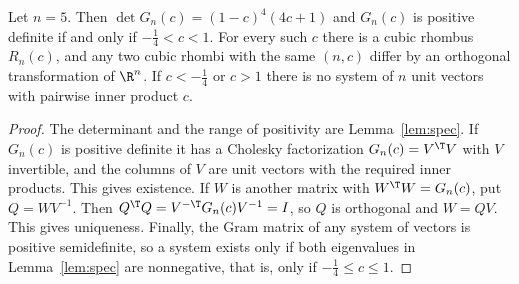 \begin{theorem}\label{thm:main}
Let $n=5$. Then $\det G_n(c)=\left(1 - c\right)^{4} \left(4 c + 1\right)$ and $G_n(c)$ is positive definite if and only if $- \frac{1}{4}<c<1$.
For every such $c$ there is a cubic rhombus $R_n(c)$, and any two cubic rhombi with the same $(n,c)$ differ by an orthogonal transformation of $\R^n$.
If $c<- \frac{1}{4}$ or $c>1$ there is no system of $n$ unit vectors with pairwise inner product $c$.
\end{theorem}
\begin{proof}
The determinant and the range of positivity are Lemma~\ref{lem:spec}.
If $G_n(c)$ is positive definite it has a Cholesky factorization $G_n(c)=V^\T V$ with $V$ invertible, and the columns of $V$ are unit vectors with the required inner products. This gives existence.
If $W$ is another matrix with $W^\T W=G_n(c)$, put $Q=WV^{-1}$. Then $Q^\T Q=V^{-\T}G_n(c)V^{-1}=I$, so $Q$ is orthogonal and $W=QV$. This gives uniqueness.
Finally, the Gram matrix of any system of vectors is positive semidefinite, so a system exists only if both eigenvalues in Lemma~\ref{lem:spec} are nonnegative, that is, only if $- \frac{1}{4}\le c\le1$.
\end{proof}
